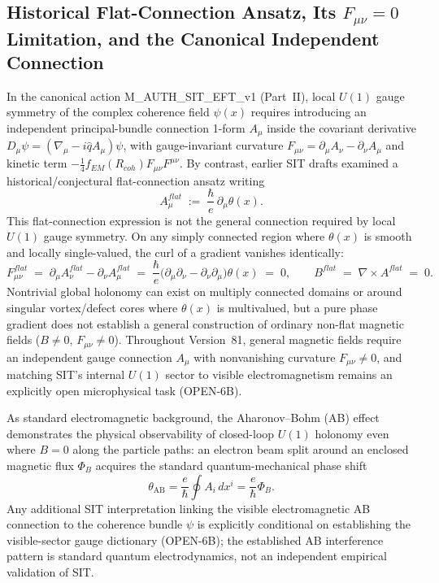 \documentclass[american,11pt,letterpaper]{article}
\def\mathbf#1{#1}%
\def\mathrm#1{#1}%
\def\texttt#1{#1}%
\def\emph#1{#1}%
\begin{document}
\subsection{Historical Flat-Connection Ansatz, Its $F_{\mu\nu} = 0$ Limitation, and the Canonical Independent Connection}

In the canonical action \texttt{M\_AUTH\_SIT\_EFT\_v1} (Part~II), local $U(1)$ gauge symmetry of the complex coherence field $\psi(x)$ requires introducing an \emph{independent} principal-bundle connection 1-form $A_\mu$ inside the covariant derivative $D_\mu\psi = (\nabla_\mu - i\hat{q}A_\mu)\psi$, with gauge-invariant curvature $F_{\mu\nu} = \partial_\mu A_\nu - \partial_\nu A_\mu$ and kinetic term $-\frac{1}{4}f_{\mathrm{EM}}(R_{\mathrm{coh}})F_{\mu\nu}F^{\mu\nu}$. By contrast, earlier SIT drafts examined a historical/conjectural flat-connection ansatz writing
\begin{equation}
   A_\mu^{\mathrm{flat}} \; := \; \frac{\hbar}{e}\,\partial_\mu\theta(x).
\end{equation}
This flat-connection expression is \emph{not} the general connection required by local $U(1)$ gauge symmetry. On any simply connected region where $\theta(x)$ is smooth and locally single-valued, the curl of a gradient vanishes identically:
\begin{equation}
   F_{\mu\nu}^{\mathrm{flat}} \;=\; \partial_\mu A_\nu^{\mathrm{flat}} - \partial_\nu A_\mu^{\mathrm{flat}}
   \;=\; \frac{\hbar}{e}\bigl(\partial_\mu\partial_\nu - \partial_\nu\partial_\mu\bigr)\theta(x) \;=\; 0,
   \qquad
   \mathbf{B}^{\mathrm{flat}} \;=\; \nabla \times \mathbf{A}^{\mathrm{flat}} \;=\; 0.
\end{equation}
Nontrivial global holonomy can exist on multiply connected domains or around singular vortex/defect cores where $\theta(x)$ is multivalued, but a pure phase gradient does \emph{not} establish a general construction of ordinary non-flat magnetic fields ($\mathbf{B} \ne 0$, $F_{\mu\nu} \ne 0$). Throughout Version~81, general magnetic fields require an independent gauge connection $A_\mu$ with nonvanishing curvature $F_{\mu\nu} \ne 0$, and matching SIT's internal $U(1)$ sector to visible electromagnetism remains an explicitly open microphysical task (\texttt{OPEN-6B}).

As standard electromagnetic background, the Aharonov--Bohm (AB) effect demonstrates the physical observability of closed-loop $U(1)$ holonomy even where $\mathbf{B} = 0$ along the particle paths: an electron beam split around an enclosed magnetic flux $\Phi_B$ acquires the standard quantum-mechanical phase shift
\[
  \theta_{\text{AB}}
  =
  \frac{e}{\hbar}\oint A_i\,dx^i = \frac{e}{\hbar}\Phi_B.
\]
Any additional SIT interpretation linking the visible electromagnetic AB connection to the coherence bundle $\psi$ is explicitly conditional on establishing the visible-sector gauge dictionary (\texttt{OPEN-6B}); the established AB interference pattern is standard quantum electrodynamics, not an independent empirical validation of SIT.
\end{document}
